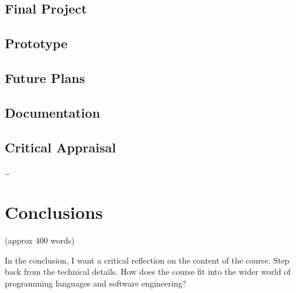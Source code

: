 \documentclass{article}
\theoremstyle{theorem}
\theoremstyle{definition}
\theoremstyle{remark}
\begin{document}
\subsection{Final Project}

\subsection{Prototype}
\subsection{Future Plans}
\subsection{Documentation}
\subsection{Critical Appraisal}

\ldots

\section{Conclusions}\label{conclusions}

(approx 400 words)

In the conclusion, I want a critical reflection on the content of the course. Step back from the technical details. How does the course fit into the wider world of programming languages and software engineering?
\end{document}
